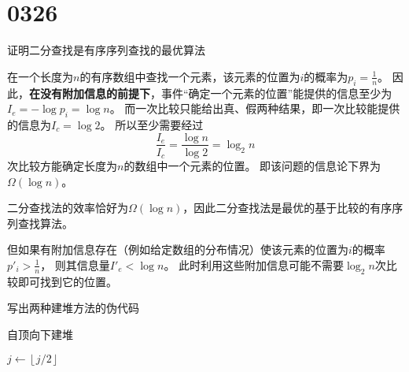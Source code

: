 \section{0326}\label{sec:0326}
\begin{questions}

    \question 证明二分查找是有序序列查找的最优算法
    \begin{solution}
        在一个长度为$n$的有序数组中查找一个元素，该元素的位置为$i$的概率为$p_i = \frac{1}{n}$。
        因此，\textbf{在没有附加信息的前提下}，事件“确定一个元素的位置”能提供的信息至少为$I_e = -\log{p_i} = \log n$。
        而一次比较只能给出真、假两种结果，即一次比较能提供的信息为$I_c = \log{2}$。
        所以至少需要经过
        \[\frac{I_e}{I_c} = \frac{ \log{n} }{ \log{2} } = \log_2{n}\]
        次比较方能确定长度为$n$的数组中一个元素的位置。
        即该问题的信息论下界为$\Omega(\log n)$。

        二分查找法的效率恰好为$\Omega(\log n)$，因此二分查找法是最优的基于比较的有序序列查找算法。

        但如果有附加信息存在（例如给定数组的分布情况）使该元素的位置为$i$的概率$p'_i > \frac{1}{n}$，
        则其信息量$I'_e < \log n$。
        此时利用这些附加信息可能不需要$\log_2{n}$次比较即可找到它的位置。

    \end{solution}


    \question 写出两种建堆方法的伪代码
    \begin{solution}

        \begin{algorithm}[H]
            \caption{自顶向下建堆}
            \begin{algorithmic}[1]
                \State {}
                \State $j \gets \left\lfloor j/2 \right\rfloor$
                \EndWhile
                \EndFor
            \end{algorithmic}
        \end{algorithm}


\end{solution}
\end{questions}
